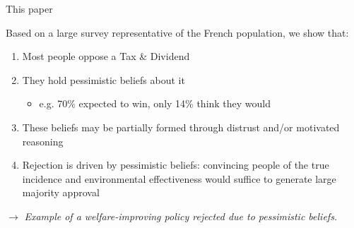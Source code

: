\documentclass[aspectratio=169,9pt,dvipsnames]{beamer}
\begin{document}
    \begin{frame}{This paper}

Based on a large survey representative of the French population, we show that:

\vspace{0.3cm}

\begin{enumerate}[<+->]
    \item Most people oppose a Tax \& Dividend \vspace{0.3cm}
    
    \item They hold pessimistic beliefs about it
    \begin{itemize}
    	\item e.g. 70\% expected to win, only 14\% think they would
    \end{itemize} \vspace{0.15cm}
    
    \item These beliefs may be partially formed through distrust and/or motivated reasoning \vspace{0.3cm}
    
    \item Rejection is driven by pessimistic beliefs: convincing people of the true incidence and environmental effectiveness would suffice to generate large majority approval
\end{enumerate}

\pause 
\vspace{0.5cm}

$\rightarrow$ \textit{Example of a welfare-improving policy rejected due to pessimistic beliefs.}

    \end{frame}
\end{document}
